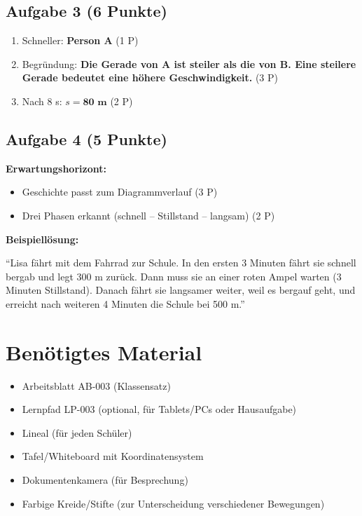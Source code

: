 \documentclass[11pt,a4paper]{article}
\begin{document}
\subsection*{Aufgabe 3 (6 Punkte)}
\begin{enumerate}[label=\alph*)]
    \item Schneller: \textbf{Person A} \hfill (1 P)
    \item Begründung: \textbf{Die Gerade von A ist steiler als die von B. Eine steilere Gerade bedeutet eine höhere Geschwindigkeit.} \hfill (3 P)
    \item Nach 8 s: $s = \textbf{80 m}$ \hfill (2 P)
\end{enumerate}

\subsection*{Aufgabe 4 (5 Punkte)}
\textbf{Erwartungshorizont:}
\begin{itemize}[leftmargin=2em]
    \item Geschichte passt zum Diagrammverlauf (3 P)
    \item Drei Phasen erkannt (schnell -- Stillstand -- langsam) (2 P)
\end{itemize}

\textbf{Beispiellösung:}

``Lisa fährt mit dem Fahrrad zur Schule. In den ersten 3 Minuten fährt sie schnell bergab und legt 300 m zurück. Dann muss sie an einer roten Ampel warten (3 Minuten Stillstand). Danach fährt sie langsamer weiter, weil es bergauf geht, und erreicht nach weiteren 4 Minuten die Schule bei 500 m.''

\section*{Benötigtes Material}

\begin{itemize}[leftmargin=2em]
    \item Arbeitsblatt AB-003 (Klassensatz)
    \item Lernpfad LP-003 (optional, für Tablets/PCs oder Hausaufgabe)
    \item Lineal (für jeden Schüler)
    \item Tafel/Whiteboard mit Koordinatensystem
    \item Dokumentenkamera (für Besprechung)
    \item Farbige Kreide/Stifte (zur Unterscheidung verschiedener Bewegungen)
\end{itemize}
\end{document}
